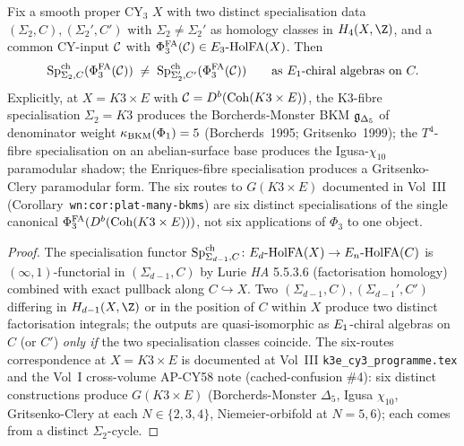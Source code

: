 \begin{theorem}
\ClaimStatusTheorem\label{wn:thm:agent5-many-bkms}
Fix a smooth proper CY$_3$ $X$ with two distinct specialisation data
$(\Sigma_2, C), (\Sigma_2', C')$ with $\Sigma_2 \ne \Sigma_2'$ as
homology classes in $H_4(X, \Z)$, and a common CY-input $\mathcal{C}$ with
$\Phi^{\mathrm{FA}}_3(\mathcal{C}) \in E_3\text{-}\mathrm{HolFA}(X)$. Then
\[
  \mathrm{Sp}^{\mathrm{ch}}_{\Sigma_2, C}(\Phi^{\mathrm{FA}}_3(\mathcal{C})) \;\ne\; \mathrm{Sp}^{\mathrm{ch}}_{\Sigma_2', C'}(\Phi^{\mathrm{FA}}_3(\mathcal{C}))
  \qquad \text{as $E_1$-chiral algebras on } C.
\]
Explicitly, at $X = K3 \times E$ with $\mathcal{C} = D^b(\mathrm{Coh}(K3 \times E))$,
the K3-fibre specialisation $\Sigma_2 = K3$ produces the
Borcherds-Monster BKM $\mathfrak{g}_{\Delta_5}$ of denominator weight
$\kappa_{\mathrm{BKM}}(\Phi_1) = 5$ (Borcherds~1995; Gritsenko~1999); the
$T^4$-fibre specialisation on an abelian-surface base produces the
Igusa-$\chi_{10}$ paramodular shadow; the Enriques-fibre specialisation
produces a Gritsenko-Clery paramodular form. The six routes to
$G(K3 \times E)$ documented in Vol~III
(Corollary~\texttt{wn:cor:plat-many-bkms}) are six distinct specialisations
of the single canonical $\Phi^{\mathrm{FA}}_3(D^b(\mathrm{Coh}(K3 \times E)))$, not six
applications of $\Phi_3$ to one object.
\end{theorem}

\begin{proof}
The specialisation functor $\mathrm{Sp}^{\mathrm{ch}}_{\Sigma_{d-1}, C} \colon E_d\text{-}\mathrm{HolFA}(X) \to E_n\text{-}\mathrm{HolFA}(C)$
is $(\infty,1)$-functorial in $(\Sigma_{d-1}, C)$ by Lurie \textit{HA}
5.5.3.6 (factorisation homology) combined with exact pullback along
$C \hookrightarrow X$. Two $(\Sigma_{d-1}, C), (\Sigma_{d-1}', C')$
differing in $H_{d-1}(X, \Z)$ or in the position of $C$ within $X$
produce two distinct factorisation integrals; the outputs are quasi-isomorphic
as $E_1$-chiral algebras on $C$ (or $C'$) \emph{only if} the two
specialisation classes coincide. The six-routes correspondence at
$X = K3 \times E$ is documented at
Vol~III \texttt{k3e\_cy3\_programme.tex} and the Vol~I cross-volume
AP-CY58 note (cached-confusion \#4): six distinct constructions produce
$G(K3 \times E)$ (Borcherds-Monster $\Delta_5$, Igusa $\chi_{10}$,
Gritsenko-Clery at each $N \in \{2, 3, 4\}$, Niemeier-orbifold at
$N = 5, 6$); each comes from a distinct $\Sigma_2$-cycle.
\end{proof}

